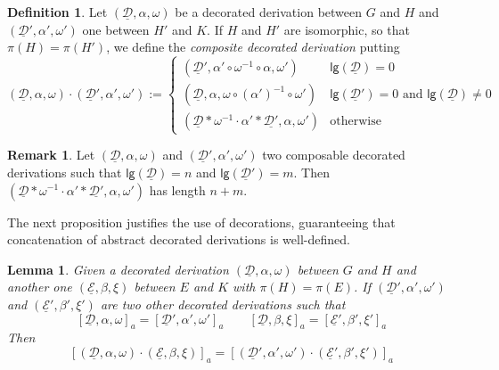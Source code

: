 \documentclass[a4paper]{article}
\newcommand{\dder}[1]{\mathscr{#1}}
\newcommand{\der}[1]{\underline{\dder{#1}}}
\newcommand{\lgh}[0]{\mathsf{lg}}
\newtheorem{lemma}[theorem]{Lemma}
\theoremstyle{definition}
\newtheorem{definition}[theorem]{Definition}
\newtheorem{remark}[theorem]{Remark}
\begin{document}
\begin{definition}\label{def:conc}
Let $(\der{D}, \alpha, \omega)$ be a decorated derivation between $G$ and $H$ and $(\der{D}', \alpha', \omega')$ one between $H'$ and $K$. If $H$ and $H'$ are isomorphic, so that $\pi(H)=\pi(H')$, we define the  \emph{composite decorated derivation} putting
\[(\der{D}, \alpha, \omega)\cdot (\der{D}', \alpha', \omega'):=\begin{cases}
(\der{D}', \alpha'\circ \omega^{-1}\circ \alpha, \omega')	&\lgh(\der{D})=0 \\
	(\der{D}, \alpha, \omega \circ (\alpha')^{-1}\circ \omega')&\lgh(\der{D}')=0 \text{ and } \lgh(\der{D})\neq 0\\
(\der{D}*\omega^{-1}\cdot \alpha'*\der{D'}, \alpha, \omega')	&\text{otherwise}
\end{cases}\]
\end{definition}


\begin{remark}\label{rem:lgt}
	Let $(\der{D}, \alpha, \omega)$ and $(\der{D}', \alpha', \omega')$ two composable decorated derivations   such that $\lgh(\der{D})=n$ and $\lgh(\der{D}')=m$.	 Then $(\der{D}*\omega^{-1}\cdot \alpha'*\der{D'}, \alpha, \omega')$ has length $n+m$.
\end{remark}

The next proposition justifies the use of decorations, guaranteeing that concatenation of abstract decorated derivations is well-defined.
\begin{lemma}\label{lem:conc}
	Given a decorated derivation $(\der{D}, \alpha, \omega)$  between $G$ and $H$ and  another one $(\der{E}, \beta, \xi)$ between $E$ and $K$ with $\pi(H)=\pi(E)$. If  $(\der{D}', \alpha', \omega')$ and $(\der{E}', \beta', \xi')$ are two other decorated derivations such that
	\[[\der{D}, \alpha, \omega]_a = [\der{D}', \alpha', \omega']_a \qquad [\der{D}, \beta, \xi]_a=[\der{E}', \beta', \xi']_a\]
	Then
	\[[(\der{D}, \alpha, \omega)\cdot (\der{E}, \beta, \xi)]_a=[(\der{D}', \alpha', \omega')\cdot (\der{E}', \beta', \xi')]_a\]
\end{lemma}
\end{document}
